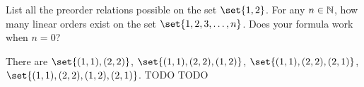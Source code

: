 \documentclass{article}
\begin{document}

\es List all the preorder relations possible on the set $\set{1, 2}$.
\ei For any $n \in \mathbb{N}$, how many linear orders exist on the set
    $\set{1, 2, 3, \ldots, n}$.
\ei Does your formula work when $n = 0$?
\ee

\ans

\es There are $\set{(1,1),(2,2)}$, $\set{(1,1),(2,2),(1,2)}$,
    $\set{(1,1),(2,2),(2,1)}$, $\set{(1,1),(2,2),(1,2),(2,1)}$.
\ei TODO
\ei TODO
\ee

\vsp
\vsp
\vsp
\vsp

\printbibliography
\end{document}
